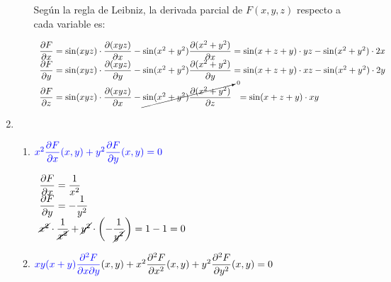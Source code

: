 \begin{enumerate}[label=\color{red}\textbf{\arabic*)}, leftmargin=*]
\begin{enumerate}[label=\color{red}\textbf{\alph*)}]
	Según la regla de Leibniz, la derivada parcial de $F(x,y,z)$ respecto a cada variable es:
	
	$\begin{array}{l}
		\dfrac{\partial F}{\partial x}=\sin(xyz)\cdot\dfrac{\partial (xyz)}{\partial x}-\sin(x^2+y^2)\dfrac{\partial(x^2+y^2)}{\partial x}=\sin(x+z+y)\cdot yz-\sin(x^2+y^2)\cdot 2x\\
		\dfrac{\partial F}{\partial y}=\sin(xyz)\cdot\dfrac{\partial (xyz)}{\partial y}-\sin(x^2+y^2)\dfrac{\partial(x^2+y^2)}{\partial y}=\sin(x+z+y)\cdot xz-\sin(x^2+y^2)\cdot 2y\\
		\dfrac{\partial F}{\partial z}=\sin(xyz)\cdot\dfrac{\partial (xyz)}{\partial x}-\cancelto{0}{\sin(x^2+y^2)\dfrac{\partial(x^2+y^2)}{\partial z}}~~=\sin(x+z+y)\cdot xy\\
	\end{array}$
	
\end{enumerate}
	\item {}
	\begin{enumerate}[label=\color{red}\textbf{\alph*)}]
		\item $\textcolor{blue}{x^2\dfrac{\partial F}{\partial x}(x,y)+y^2\dfrac{\partial F}{\partial y}(x,y)=0}$
		
		$\begin{array}{l}
		\dfrac{\partial F}{\partial x}=\dfrac{1}{x^2}\\
		\dfrac{\partial F}{\partial y}=-\dfrac{1}{y^2}\\
		\cancel{x^2}\cdot\dfrac{1}{\cancel{x^2}}+\cancel{y^2}\cdot\left(-\dfrac{1}{\cancel{y^2}}\right)=1-1=0
		\end{array}$
		
		\item $\textcolor{blue}{xy(x+y)\dfrac{\partial^2 F}{\partial x\partial y}}(x,y)+x^2\dfrac{\partial^2 F}{\partial x^2}(x,y)+y^2\dfrac{\partial^2 F}{\partial y^2}(x,y)=0$
		

\end{enumerate}
\end{enumerate}

